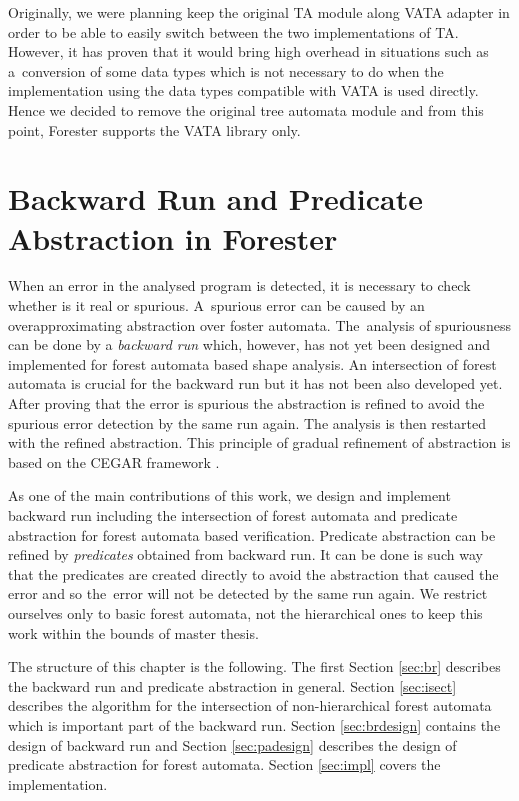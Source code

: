 Originally, we were planning keep the original TA module along VATA adapter
in order to be able to easily switch between the two implementations of TA.
However, it has proven that it would bring high overhead in situations such as
a~conversion of some data types which is not necessary to do
when the implementation using the data types compatible
with VATA is used directly.
Hence we decided to remove the original tree automata module and
from this point, Forester supports the VATA library only.

\chapter{Backward Run and Predicate Abstraction in Forester}
\label{ch:backward}

When an error in the analysed program is detected,
it is necessary to check whether is it real or spurious.
A~spurious error can be caused by an overapproximating abstraction over foster automata.
The~analysis of spuriousness can be done by a \emph{backward run} which, however, has not
yet been designed and implemented for forest automata based shape analysis.
An intersection of forest automata is crucial for the backward run but it has not
been also developed yet.
After proving that the error is spurious the abstraction is refined to avoid
the spurious error detection by the same run again.
The analysis is then restarted with the refined abstraction.
This principle of gradual refinement of abstraction is based on the CEGAR framework \cite{cegar}.

As one of the main contributions of this work,
we design and implement backward run including the intersection of forest automata
and predicate abstraction \cite{artmc} for forest automata based verification.
Predicate abstraction can be refined by \emph{predicates} obtained from backward run.
It can be done is such way that the predicates are created directly
to avoid the abstraction that caused the error
and so the~error will not be detected by the same run again.
We restrict ourselves only to basic forest automata, not the hierarchical ones
to keep this work within the bounds of master thesis.

The structure of this chapter is the following.
The first Section \ref{sec:br} describes the backward run and predicate abstraction in general.
Section \ref{sec:isect} describes the algorithm for the intersection of non-hierarchical forest automata
which is important part of the backward run.
Section \ref{sec:brdesign} contains the design of backward run
and Section \ref{sec:padesign} describes the design of predicate abstraction for forest automata.
Section \ref{sec:impl} covers the implementation.

